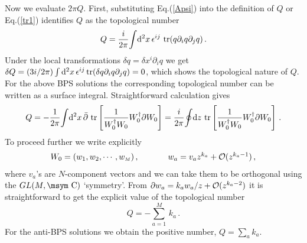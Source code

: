 \documentclass[a4paper,12pt]{article}
\def\tr{{\mbox{\,tr}}}
\def\M{{\scriptscriptstyle M}}
\def\Com{{\mathop{\hbox{\msym \char  '103}}}}
\begin{document}
Now we evaluate $2\pi Q$. First, substituting  Eq.(\ref{Apsi}) into the definition of  $Q$ or  Eq.(\ref{tr1})
identifies   $Q$ as the topological number \cite{pere}
\begin{equation}
Q=\frac{i}{2\pi}\displaystyle{\int}{\rm
d}^{2}x\,\epsilon^{ij}\,\tr(q\partial_{i}q\partial_{j}q)\,.
\label{tr2}
\end{equation}
Under the local transformations $\delta q=\delta x^{i}\partial_{i}q$ we get $\delta Q=(3i/{2\pi})\int{\rm
d}^{2}x\,\epsilon^{ij}\tr(\delta q\partial_{i}q\partial_{j}q)=0$, which shows the topological nature of $Q$.  For
the above BPS solutions the corresponding topological number can be written as a surface integral. Straightforward
calculation gives
\begin{equation}
Q=-\frac{1}{2\pi}\displaystyle{\int}{{\rm
d}^{2}x}\,\bar{\partial}\,\tr\left[\displaystyle{\frac{1}
{W^{\dagger}_{0}W_{0}}}W^{\dagger}_{0}\partial
W_{0}\right]= \frac{i}{2\pi}\displaystyle{\oint}{{\rm
d}z}\,\tr\left[\displaystyle{\frac{1}{W^{\dagger}_{0}W_{0}}}W^{\dagger}_{0}\partial
W_{0}\right]\,. \label{tr3}
\end{equation}
To proceed further  we write explicitly
\begin{equation}
\begin{array}{ll}
W_{0}=(w_{1},w_{2},\cdots,w_{\M})\,,~~~~&~~~~w_{a}=v_{a}z^{k_{a}}+{\cal
O}(z^{k_{a}-1})\,,
\end{array}
\label{Ww}
\end{equation}
where $v_{a}$'s are  $N$-component vectors and we can take them to be
orthogonal using the $GL(M,\Com)$ `symmetry'. From $\partial w_{a}=k_{a}w_{a}/z+{\cal O}(z^{k_{a}-2})$ it is
straightforward to get the explicit value of the topological number
\begin{equation} Q=-\displaystyle{\sum_{a=1}^{M}}\,k_{a}\,.
\end{equation}
For the anti-BPS solutions we obtain the positive number,
$Q=\sum_{a}k_{a}$.\newline
\end{document}

